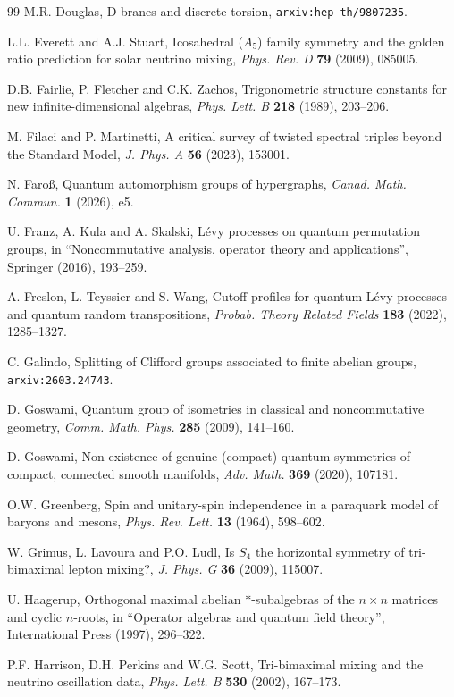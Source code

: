 \documentclass[11pt]{amsart}
\theoremstyle{definition}
\begin{document}
\begin{thebibliography}{99}
 M.R. Douglas, D-branes and discrete torsion, {\tt arxiv:hep-th/9807235}.

 L.L. Everett and A.J. Stuart, Icosahedral ($A_5$) family symmetry and the golden ratio prediction for solar neutrino mixing, {\em Phys. Rev. D} {\bf 79} (2009), 085005.

 D.B. Fairlie, P. Fletcher and C.K. Zachos, Trigonometric structure constants for new infinite-dimensional algebras, {\em Phys. Lett. B} {\bf 218} (1989), 203--206.

 M. Filaci and P. Martinetti, A critical survey of twisted spectral triples beyond the Standard Model, {\em J. Phys. A} {\bf 56} (2023), 153001.

 N. Faro\ss, Quantum automorphism groups of hypergraphs, {\em Canad. Math. Commun.} {\bf 1} (2026), e5.

 U. Franz, A. Kula and A. Skalski, L\'evy processes on quantum permutation groups, in ``Noncommutative analysis, operator theory and applications'', Springer (2016), 193--259.

 A. Freslon, L. Teyssier and S. Wang, Cutoff profiles for quantum L\'evy processes and quantum random transpositions, {\em Probab. Theory Related Fields} {\bf 183} (2022), 1285--1327.

 C. Galindo, Splitting of Clifford groups associated to finite abelian groups, {\tt arxiv:2603.24743}.

 D. Goswami, Quantum group of isometries in classical and noncommutative geometry, {\em Comm. Math. Phys.} {\bf 285} (2009), 141--160.

 D. Goswami, Non-existence of genuine (compact) quantum symmetries of compact, connected smooth manifolds, {\em Adv. Math.} {\bf 369} (2020), 107181.

 O.W. Greenberg, Spin and unitary-spin independence in a paraquark model of baryons and mesons, {\em Phys. Rev. Lett.} {\bf 13} (1964), 598--602.

 W. Grimus, L. Lavoura and P.O. Ludl, Is $S_4$ the horizontal symmetry of tri-bimaximal lepton mixing?, {\em J. Phys. G} {\bf 36} (2009), 115007.

 U. Haagerup, Orthogonal maximal abelian $*$-subalgebras of the $n\times n$ matrices and cyclic $n$-roots, in ``Operator algebras and quantum field theory'', International Press (1997), 296--322.

 P.F. Harrison, D.H. Perkins and W.G. Scott, Tri-bimaximal mixing and the neutrino oscillation data, {\em Phys. Lett. B} {\bf 530} (2002), 167--173.


\end{thebibliography}
\end{document}
